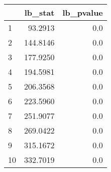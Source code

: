 \begin{tabular}{lrr}
\toprule
{} &   lb\_stat &  lb\_pvalue \\
\midrule
1  &   93.2913 &        0.0 \\
2  &  144.8146 &        0.0 \\
3  &  177.9250 &        0.0 \\
4  &  194.5981 &        0.0 \\
5  &  206.3568 &        0.0 \\
6  &  223.5960 &        0.0 \\
7  &  251.9077 &        0.0 \\
8  &  269.0422 &        0.0 \\
9  &  315.1672 &        0.0 \\
10 &  332.7019 &        0.0 \\
\bottomrule
\end{tabular}
